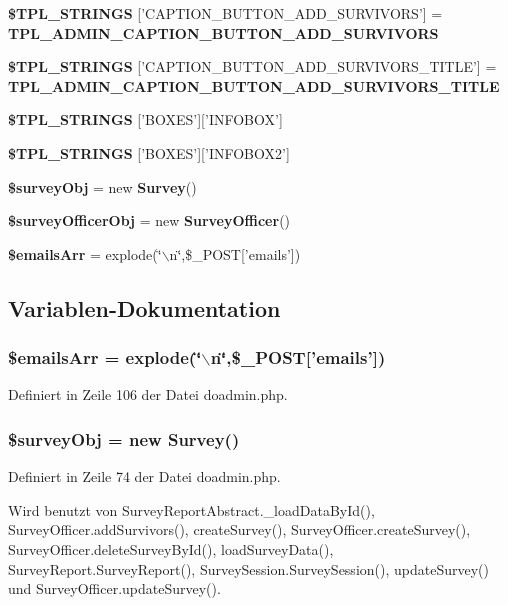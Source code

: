 \begin{CompactItemize}
\item 
{\bf \$TPL\_\-STRINGS} ['CAPTION\_\-BUTTON\_\-ADD\_\-SURVIVORS'] = {\bf TPL\_\-ADMIN\_\-CAPTION\_\-BUTTON\_\-ADD\_\-SURVIVORS}
\item 
{\bf \$TPL\_\-STRINGS} ['CAPTION\_\-BUTTON\_\-ADD\_\-SURVIVORS\_\-TITLE'] = {\bf TPL\_\-ADMIN\_\-CAPTION\_\-BUTTON\_\-ADD\_\-SURVIVORS\_\-TITLE}
\item 
{\bf \$TPL\_\-STRINGS} ['BOXES']['INFOBOX']
\item 
{\bf \$TPL\_\-STRINGS} ['BOXES']['INFOBOX2']
\item 
{\bf \$surveyObj} = new {\bf Survey}()
\item 
{\bf \$surveyOfficerObj} = new {\bf SurveyOfficer}()
\item 
{\bf \$emailsArr} = explode(\char`\"{}$\backslash$n\char`\"{},\$\_\-POST['emails'])
\end{CompactItemize}


\subsection{Variablen-Dokumentation}
\subsubsection{\setlength{\rightskip}{0pt plus 5cm}\$emailsArr = explode(\char`\"{}$\backslash$n\char`\"{},\$\_\-POST['emails'])}\label{doadmin_8php_727c8cf0c0650ffad84166f72479a4e2}




Definiert in Zeile 106 der Datei doadmin.php.
\subsubsection{\setlength{\rightskip}{0pt plus 5cm}\$surveyObj = new {\bf Survey}()}\label{doadmin_8php_40c85ba447202b303514c8d27f90e101}




Definiert in Zeile 74 der Datei doadmin.php.

Wird benutzt von SurveyReportAbstract.\_\-loadDataById(), SurveyOfficer.addSurvivors(), createSurvey(), SurveyOfficer.createSurvey(), SurveyOfficer.deleteSurveyById(), loadSurveyData(), SurveyReport.SurveyReport(), SurveySession.SurveySession(), updateSurvey() und SurveyOfficer.updateSurvey().
